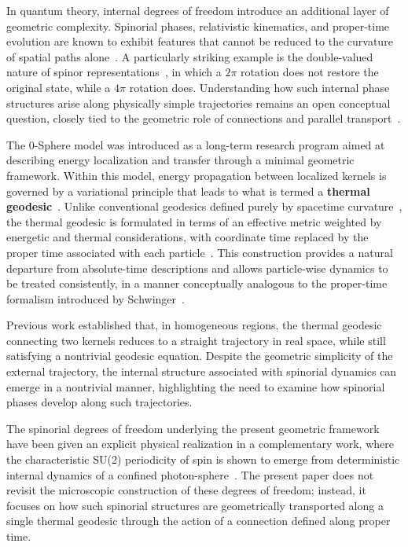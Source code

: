 \documentclass[%
 reprint,
 amsmath,amssymb,
 aps,
 prb,
]{revtex4-2}
\numberwithin{equation}{section}
\begin{document}
In quantum theory, internal degrees of freedom introduce an additional layer of geometric complexity. Spinorial phases, relativistic kinematics, and proper-time evolution are known to exhibit features that cannot be reduced to the curvature of spatial paths alone~\cite{wigner1939,bargmann1954,dirac1928}. A particularly striking example is the double-valued nature of spinor representations~\cite{sakurai2017,shankar2016}, in which a $2\pi$ rotation does not restore the original state, while a $4\pi$ rotation does. Understanding how such internal phase structures arise along physically simple trajectories remains an open conceptual question, closely tied to the geometric role of connections and parallel transport~\cite{nakahara2003,berry1984}.

The 0-Sphere model was introduced as a long-term research program aimed at describing energy localization and transfer through a minimal geometric framework. Within this model, energy propagation between localized kernels is governed by a variational principle that leads to what is termed a \textbf{thermal geodesic}~\cite{hanamura17765017}. Unlike conventional geodesics defined purely by spacetime curvature~\cite{misner1973,wald1984}, the thermal geodesic is formulated in terms of an effective metric weighted by energetic and thermal considerations, with coordinate time replaced by the proper time associated with each particle~\cite{bjorken1964,ryder1996}. This construction provides a natural departure from absolute-time descriptions and allows particle-wise dynamics to be treated consistently, in a manner conceptually analogous to the proper-time formalism introduced by Schwinger~\cite{schwinger1951}.

Previous work established that, in homogeneous regions, the thermal geodesic connecting two kernels reduces to a straight trajectory in real space, while still satisfying a nontrivial geodesic equation. Despite the geometric simplicity of the external trajectory, the internal structure associated with spinorial dynamics can emerge in a nontrivial manner, highlighting the need to examine how spinorial phases develop along such trajectories.

The spinorial degrees of freedom underlying the present geometric framework have been given an explicit physical realization in a complementary work, where the characteristic SU(2) periodicity of spin is shown to emerge from deterministic internal dynamics of a confined photon-sphere~\cite{hanamura17765238}. The present paper does not revisit the microscopic construction of these degrees of freedom; instead, it focuses on how such spinorial structures are geometrically transported along a single thermal geodesic through the action of a connection defined along proper time.
\end{document}
